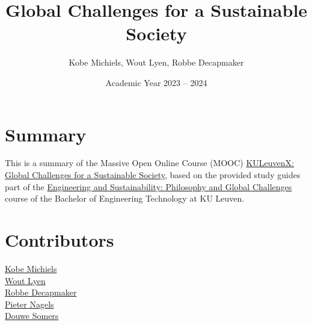 \documentclass[kul]{kulakarticle} %
\title{Global Challenges for a Sustainable Society}
\author{Kobe Michiels, Wout Lyen, Robbe Decapmaker}
\date{Academic Year 2023 -- 2024}
\begin{document}
\maketitle

\section*{Summary}

This is a summary of the Massive Open Online Course (MOOC) \href{https://www.edx.org/learn/science/ku-leuven-global-challenges-for-a-sustainable-society?webview=false&campaign=Global+Challenges+for+a+Sustainable+Society&source=edx&product_category=course&placement_url=https%3A%2F%2Fwww.edx.org%2Fschool%2Fkuleuvenx}{KULeuvenX: Global Challenges for a Sustainable Society}, based on the provided study guides part of the \href{https://onderwijsaanbod.kuleuven.be/syllabi/v/e/T3AID1E.htm#activetab=inhoud_idp1690064}{Engineering and Sustainability: Philosophy and Global Challenges} course of the Bachelor of Engineering Technology at KU Leuven.

\section*{Contributors}
\href{https://github.com/michielskobe}{Kobe Michiels}\\
\href{https://github.com/woutlyen}{Wout Lyen}\\
\href{https://github.com/debber1}{Robbe Decapmaker}\\
\href{https://github.com/pnagels2004}{Pieter Nagels}\\
\href{https://github.com/DraakjeYoblama}{Douwe Somers}
\end{document}
